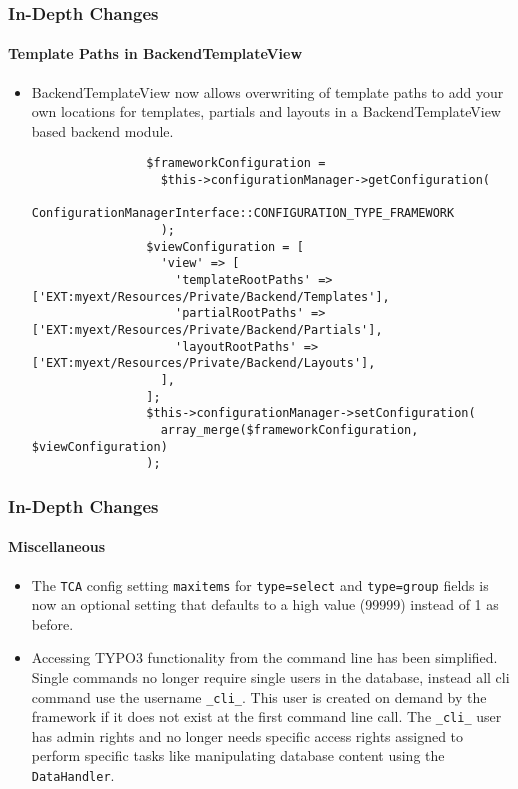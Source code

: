 \begin{frame}[fragile]
	\frametitle{In-Depth Changes}
	\framesubtitle{Template Paths in BackendTemplateView}

	\lstset{basicstyle=\tiny\ttfamily}

	\begin{itemize}
		\item BackendTemplateView now allows overwriting of template paths to add your own locations for templates,
			partials and layouts in a BackendTemplateView based backend module.

			\begin{lstlisting}
				$frameworkConfiguration =
				  $this->configurationManager->getConfiguration(
				    ConfigurationManagerInterface::CONFIGURATION_TYPE_FRAMEWORK
				  );
				$viewConfiguration = [
				  'view' => [
				    'templateRootPaths' => ['EXT:myext/Resources/Private/Backend/Templates'],
				    'partialRootPaths' => ['EXT:myext/Resources/Private/Backend/Partials'],
				    'layoutRootPaths' => ['EXT:myext/Resources/Private/Backend/Layouts'],
				  ],
				];
				$this->configurationManager->setConfiguration(
				  array_merge($frameworkConfiguration, $viewConfiguration)
				);
			\end{lstlisting}

	\end{itemize}

\end{frame}


\begin{frame}[fragile]
	\frametitle{In-Depth Changes}
	\framesubtitle{Miscellaneous}

	\begin{itemize}
		\item The \texttt{TCA} config setting \texttt{maxitems} for \texttt{type=select} and \texttt{type=group}
			fields is now an optional setting that defaults to a high value (99999) instead of 1 as before.

		\item Accessing TYPO3 functionality from the command line has been simplified. Single commands no longer
			require single users in the database, instead all cli command use the username \texttt{\_cli\_}.
			This user is created on demand by the framework if it does not exist at the first command line call.
			The \texttt{\_cli\_} user has admin rights and no longer needs specific access rights assigned to
			perform specific tasks like manipulating database content using the \texttt{DataHandler}.

	\end{itemize}

\end{frame}

